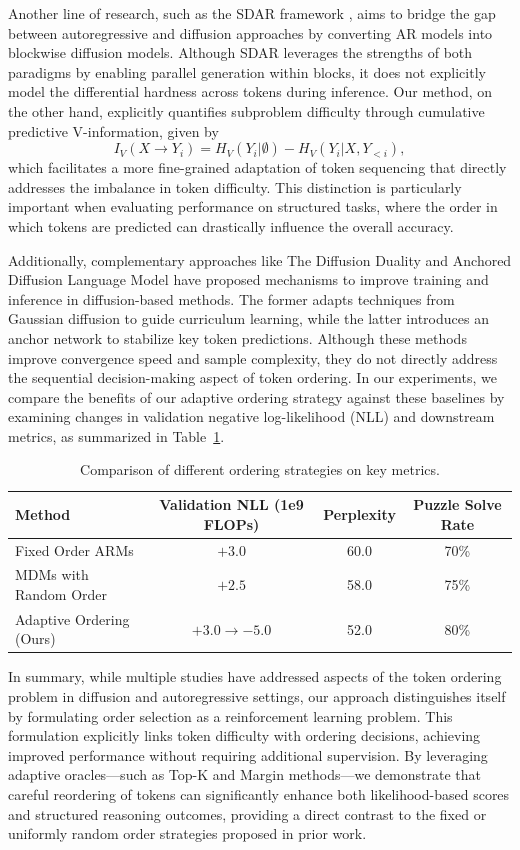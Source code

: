 \documentclass{article} %
\begin{document}
Another line of research, such as the SDAR framework \citep{cheng2025sdar}, aims to bridge the gap between autoregressive and diffusion approaches by converting AR models into blockwise diffusion models. Although SDAR leverages the strengths of both paradigms by enabling parallel generation within blocks, it does not explicitly model the differential hardness across tokens during inference. Our method, on the other hand, explicitly quantifies subproblem difficulty through cumulative predictive V-information, given by 
\[
I_V(X \to Y_i) = H_V(Y_i|\emptyset) - H_V(Y_i|X, Y_{<i}),
\]
which facilitates a more fine-grained adaptation of token sequencing that directly addresses the imbalance in token difficulty. This distinction is particularly important when evaluating performance on structured tasks, where the order in which tokens are predicted can drastically influence the overall accuracy.

Additionally, complementary approaches like The Diffusion Duality \citep{sahoo2025diffusion} and Anchored Diffusion Language Model \citep{rout2025anchored} have proposed mechanisms to improve training and inference in diffusion-based methods. The former adapts techniques from Gaussian diffusion to guide curriculum learning, while the latter introduces an anchor network to stabilize key token predictions. Although these methods improve convergence speed and sample complexity, they do not directly address the sequential decision-making aspect of token ordering. In our experiments, we compare the benefits of our adaptive ordering strategy against these baselines by examining changes in validation negative log-likelihood (NLL) and downstream metrics, as summarized in Table~\ref{tab:comparison}.

\begin{table}[h]
\centering
\begin{tabular}{lccc}
\hline
Method & Validation NLL (1e9 FLOPs) & Perplexity & Puzzle Solve Rate \\
\hline
Fixed Order ARMs & $+3.0$ & 60.0 & 70\% \\
MDMs with Random Order & $+2.5$ & 58.0 & 75\% \\
Adaptive Ordering (Ours) & $+3.0 \rightarrow -5.0$ & 52.0 & 80\% \\
\hline
\end{tabular}
\caption{Comparison of different ordering strategies on key metrics.}
\label{tab:comparison}
\end{table}

In summary, while multiple studies have addressed aspects of the token ordering problem in diffusion and autoregressive settings, our approach distinguishes itself by formulating order selection as a reinforcement learning problem. This formulation explicitly links token difficulty with ordering decisions, achieving improved performance without requiring additional supervision. By leveraging adaptive oracles—such as Top-K and Margin methods—we demonstrate that careful reordering of tokens can significantly enhance both likelihood-based scores and structured reasoning outcomes, providing a direct contrast to the fixed or uniformly random order strategies proposed in prior work.
\end{document}
